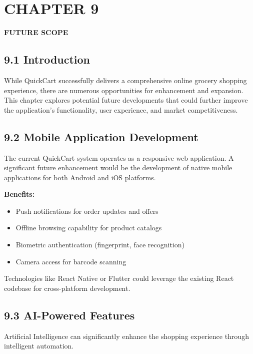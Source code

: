 \documentclass[12pt,a4paper]{report}
\begin{document}
\chapter*{CHAPTER 9}

\begin{center}
    \textbf{\large FUTURE SCOPE}
\end{center}

\section*{9.1 Introduction}

While QuickCart successfully delivers a comprehensive online grocery shopping experience, there are numerous opportunities for enhancement and expansion. This chapter explores potential future developments that could further improve the application's functionality, user experience, and market competitiveness.

\section*{9.2 Mobile Application Development}

The current QuickCart system operates as a responsive web application. A significant future enhancement would be the development of native mobile applications for both Android and iOS platforms.

\textbf{Benefits:}
\begin{itemize}
    \item Push notifications for order updates and offers
    \item Offline browsing capability for product catalogs
    \item Biometric authentication (fingerprint, face recognition)
    \item Camera access for barcode scanning
\end{itemize}

Technologies like React Native or Flutter could leverage the existing React codebase for cross-platform development.

\section*{9.3 AI-Powered Features}

Artificial Intelligence can significantly enhance the shopping experience through intelligent automation.
\end{document}
